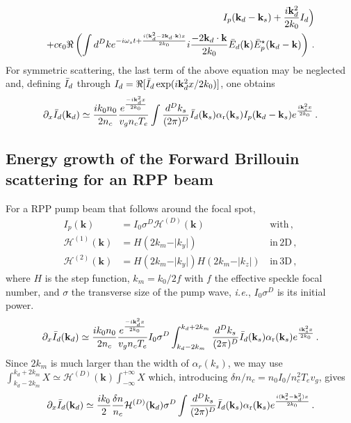 \documentclass[
 reprint,
 amsmath,amssymb,
 aps,
]{revtex4-1}
\begin{document}
\begin{widetext}
\begin{align}
I_p(\mathbf{k}_d-\mathbf{k}_s)
+\frac{i\mathbf{k}_d^2}{2k_0} I_d \Big) 
  \nonumber\\
 +c\epsilon_0  \Re\left( \int d^Dk e^{-i\omega_s t+\frac{ i( \mathbf{k}_d^2-2\mathbf{k}_d\cdot \mathbf{k} )x}{2k_0}} 
i\frac{ -2\mathbf{k}_d\cdot \mathbf{k}}{2k_0} \Bar{E}_d(\mathbf{k})\Bar{E}_p^\star(\mathbf{k}_d-\mathbf{k} )
  \right)
\, . \label{eq:g2}
\end{align}
For symmetric scattering, the last term  of the above equation may be neglected and, defining $\Bar{I}_d$ through $I_d = \Re[\Bar{I}_d\exp(i\mathbf{k}_d^2x/2k_0)]$, one obtains
 \begin{align}
\partial_x\Bar{I}_d(\mathbf{k}_d)\simeq  \frac{ik_0n_0}{2n_c} \frac{e^{\frac{-i\mathbf{k}_d^2x}{2k_0}} }{  v_g n_c T_e}   
  \int \frac{d^Dk_s}{(2\pi)^D} \Bar{I}_d(\mathbf{k}_s) \alpha_\mathrm{r}(\mathbf{k}_s) 
I_p(\mathbf{k}_d-\mathbf{k}_s)
e^{\frac{i\mathbf{k}_s^2x}{2k_0}} 
\, . \label{eq:g3}
\end{align}
 
 \subsection{Energy growth of the Forward Brillouin scattering for an RPP beam }
 For a RPP pump beam that follows around the focal spot, 
   \begin{align}
   I_p(\mathbf{k}) &= I_0 \sigma ^D \mathcal{H}^{(D)}(\mathbf{k})  &\,  \mathrm{with} \, ,\\ 
   \mathcal{H}^{(1)}(\mathbf{k}) &= H(2k_m - \vert k_y \vert ) &\,  \mathrm{in}\, \mathrm{2D} \, ,\\ 
    \mathcal{H}^{(2)}(\mathbf{k}) &=   H(2k_m - \vert k_y \vert ) H(2k_m - \vert k_z \vert ) &\,  \mathrm{in}\, \mathrm{3D} \, ,
   \end{align} 
     where $H$ is the step function, $k_m=k_0/2f$ with $f$ the effective speckle focal number,  and $\sigma$ the transverse size of the pump wave, \emph{i.e.}, $I_0\sigma^D$ is its initial power.
  \begin{align}
\partial_x\Bar{I}_d(\mathbf{k}_d)\simeq  \frac{ik_0n_0}{2n_c} \frac{e^{\frac{-i\mathbf{k}_d^2x}{2k_0}} }{  v_g n_c T_e}   
 I_0\sigma^D \int_{k_d-2k_m}^{k_d+2k_m} \frac{d^Dk_s}{(2\pi)^D} \Bar{I}_d(\mathbf{k}_s) \alpha_\mathrm{r}(\mathbf{k}_s) 
e^{\frac{i\mathbf{k}_s^2x}{2k_0}} 
\, . \label{eq:g4}
\end{align}
Since $2k_m$ is much larger than the width of $\alpha_r(k_s)$, we may use $\int_{k_d-2k_m}^{k_d+2k_m} X \simeq \mathcal{H}^{(D)}(\mathbf{k}) \int_{-\infty}^{+\infty}X$
which, introducing $\delta n/n_c=n_0I_0/{n_c^2 T_ev_g}$, gives
 \begin{align}
\partial_x\Bar{I}_d(\mathbf{k}_d)\simeq  \frac{ik_0}{2}  \frac{\delta n}{n_c}
 \mathcal{H}^{(D)}(\mathbf{k}_d)\sigma^D  \int \frac{d^Dk_s}{(2\pi)^D} \Bar{I}_d(\mathbf{k}_s) \alpha_\mathrm{r}(\mathbf{k}_s) 
e^{\frac{i(\mathbf{k}_s^2-\mathbf{k}_d^2)x}{2k_0}} 
\, . \label{eq:g5}
\end{align}


\end{widetext}
\end{document}
